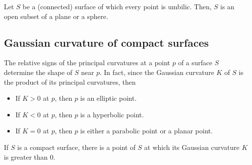 \begin{proposition}
  Let $S$ be a (connected) surface of which every point is umbilic.
  Then, $S$ is an open subset of a plane or a sphere.
\end{proposition}

\subsection{Gaussian curvature of compact surfaces}

The relative signs of the principal curvatures at a point $p$ of
a surface $S$ determine the shape of $S$ near $p$.
In fact, since the Gaussian curvature $K$ of $S$ is the product
of its principal curvatures, then

\begin{itemize}
  \item If $K > 0$ at $p$, then $p$ is an elliptic point.
  \item If $K < 0$ at $p$, then $p$ is a hyperbolic point.
  \item If $K = 0$ at $p$, then $p$ is either a parabolic point or a planar point.
\end{itemize}

\begin{proposition}
  If $S$ is a compact surface, there is a point of $S$ at which its
  Gaussian curvature $K$ is greater than $0$.
\end{proposition}